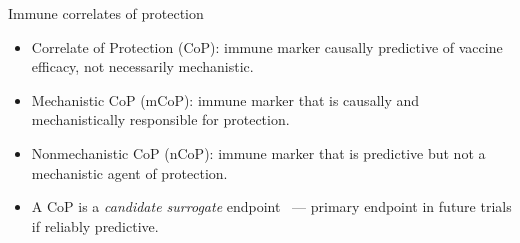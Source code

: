 \documentclass{beamer}
\begin{document}
\begin{frame}[c]{Immune correlates of
  protection~\citep{plotkin2012nomenclature}}

\begin{center}
\begin{itemize}
  \itemsep8pt
  \item Correlate of Protection (CoP): immune marker causally predictive of
    vaccine efficacy, not necessarily mechanistic.
  \item Mechanistic CoP (mCoP): immune marker that is causally and
    mechanistically responsible for protection.
  \item Nonmechanistic CoP (nCoP): immune marker that is predictive but not a
    mechanistic agent of protection.
  \item A CoP is a \textit{candidate surrogate}
      endpoint~\citep{prentice1989surrogate} --- primary
      endpoint in future trials if reliably predictive.
\end{itemize}
\end{center}

\note{
}

\end{frame}

\end{document}
